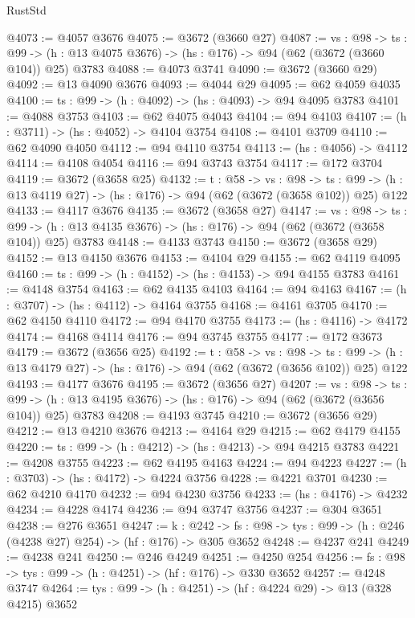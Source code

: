 \begin{lexlean}{RustStd}
\begin{coremodule}
@4073 := @4057 @3676
@4075 := @3672 (@3660 @27)
@4087 := {vs : @98} ->
  {ts : @99} -> (h : @13 @4075 @3676) -> (hs : @176) -> @94 (@62 (@3672 (@3660 @104)) @25) @3783
@4088 := @4073 @3741
@4090 := @3672 (@3660 @29)
@4092 := @13 @4090 @3676
@4093 := @4044 @29
@4095 := @62 @4059 @4035
@4100 := {ts : @99} -> (h : @4092) -> (hs : @4093) -> @94 @4095 @3783
@4101 := @4088 @3753
@4103 := @62 @4075 @4043
@4104 := @94 @4103
@4107 := (h : @3711) -> (hs : @4052) -> @4104 @3754
@4108 := @4101 @3709
@4110 := @62 @4090 @4050
@4112 := @94 @4110 @3754
@4113 := (hs : @4056) -> @4112
@4114 := @4108 @4054
@4116 := @94 @3743 @3754
@4117 := @172 @3704
@4119 := @3672 (@3658 @25)
@4132 := {t : @58} ->
  {vs : @98} ->
  {ts : @99} -> (h : @13 @4119 @27) -> (hs : @176) -> @94 (@62 (@3672 (@3658 @102)) @25) @122
@4133 := @4117 @3676
@4135 := @3672 (@3658 @27)
@4147 := {vs : @98} ->
  {ts : @99} -> (h : @13 @4135 @3676) -> (hs : @176) -> @94 (@62 (@3672 (@3658 @104)) @25) @3783
@4148 := @4133 @3743
@4150 := @3672 (@3658 @29)
@4152 := @13 @4150 @3676
@4153 := @4104 @29
@4155 := @62 @4119 @4095
@4160 := {ts : @99} -> (h : @4152) -> (hs : @4153) -> @94 @4155 @3783
@4161 := @4148 @3754
@4163 := @62 @4135 @4103
@4164 := @94 @4163
@4167 := (h : @3707) -> (hs : @4112) -> @4164 @3755
@4168 := @4161 @3705
@4170 := @62 @4150 @4110
@4172 := @94 @4170 @3755
@4173 := (hs : @4116) -> @4172
@4174 := @4168 @4114
@4176 := @94 @3745 @3755
@4177 := @172 @3673
@4179 := @3672 (@3656 @25)
@4192 := {t : @58} ->
  {vs : @98} ->
  {ts : @99} -> (h : @13 @4179 @27) -> (hs : @176) -> @94 (@62 (@3672 (@3656 @102)) @25) @122
@4193 := @4177 @3676
@4195 := @3672 (@3656 @27)
@4207 := {vs : @98} ->
  {ts : @99} -> (h : @13 @4195 @3676) -> (hs : @176) -> @94 (@62 (@3672 (@3656 @104)) @25) @3783
@4208 := @4193 @3745
@4210 := @3672 (@3656 @29)
@4212 := @13 @4210 @3676
@4213 := @4164 @29
@4215 := @62 @4179 @4155
@4220 := {ts : @99} -> (h : @4212) -> (hs : @4213) -> @94 @4215 @3783
@4221 := @4208 @3755
@4223 := @62 @4195 @4163
@4224 := @94 @4223
@4227 := (h : @3703) -> (hs : @4172) -> @4224 @3756
@4228 := @4221 @3701
@4230 := @62 @4210 @4170
@4232 := @94 @4230 @3756
@4233 := (hs : @4176) -> @4232
@4234 := @4228 @4174
@4236 := @94 @3747 @3756
@4237 := @304 @3651
@4238 := @276 @3651
@4247 := {k : @242} ->
  {fs : @98} -> {tys : @99} -> (h : @246 (@4238 @27) @254) -> (hf : @176) -> @305 @3652
@4248 := @4237 @241
@4249 := @4238 @241
@4250 := @246 @4249
@4251 := @4250 @254
@4256 := {fs : @98} -> {tys : @99} -> (h : @4251) -> (hf : @176) -> @330 @3652
@4257 := @4248 @3747
@4264 := {tys : @99} -> (h : @4251) -> (hf : @4224 @29) -> @13 (@328 @4215) @3652

\end{coremodule}
\end{lexlean}
